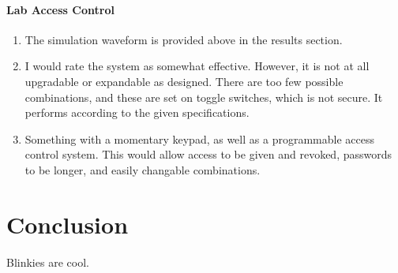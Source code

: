 \documentclass{article}
\begin{document}
    \paragraph{Lab Access Control}

    \begin{enumerate}
            \item The simulation waveform is provided above in the results section.

            \item I would rate the system as somewhat effective. However, it is not at all upgradable or expandable as designed.
                There are too few possible combinations, and these are set on toggle switches, which is not
                secure.
                It performs according to the given specifications.

            \item Something with a momentary keypad, as well as a programmable access control system.
                This would allow access to be given and revoked, passwords to be longer, and easily changable
                combinations.

    \end{enumerate}


    \section{Conclusion}
    Blinkies are cool.
\end{document}
